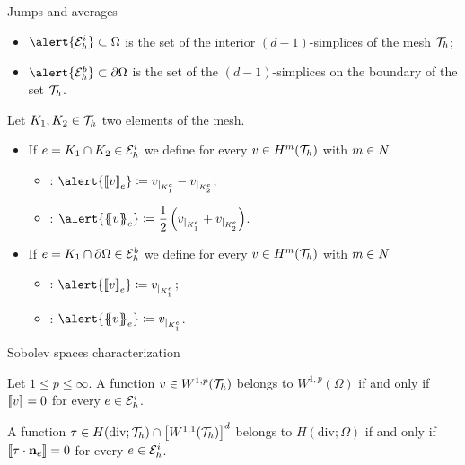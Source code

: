 \begin{frame}{Jumps and averages}
	\scriptsize
\begin{itemize}
	\item $\alert{\E_h^i}\subset\Omega$ is the set of the interior $(d-1)$-simplices of the mesh $\mathcal{T}_h$;
	\item $\alert{\E_h^b}\subset\partial\Omega$ is the set of the $(d-1)$-simplices on the boundary of the set $\mathcal{T}_h$.
\end{itemize}

\begin{definicion}
	Let $K_1,K_2\in\mathcal{T}_h$ two elements of the mesh.
	
	\begin{itemize}
		\item If $e=K_1\cap K_2\in \mathcal{E}_h^i$ we define for every $v\in H^m(\mathcal{T}_h)$ with $m\in\relax N$
		
		\begin{itemize}\itemsep1em
			\item {}: $\alert{\salto{v}_e}\coloneqq v_{|_{K_1^e}}-v_{|_{K_{2}^e}}$;
			\item {}: $\alert{\media{v}_e}\coloneqq \dfrac{1}{2}\left(v_{|_{K_1^e}}+v_{|_{K_{2}^e}}\right) $.
		\end{itemize}
		
		\item If $e=K_1\cap \partial\Omega\in \mathcal{E}_h^b$ we define for every $v\in H^m(\mathcal{T}_h)$ with $m\in\relax N$
		
		\begin{itemize}\itemsep1em
			\item {}: $\alert{\salto{v}_e}\coloneqq v_{|_{K_1^e}}$;
			\item {}: $\alert{\media{v}_e}\coloneqq v_{|_{K_1^e}}$.
		\end{itemize}
		
	\end{itemize}
	
\end{definicion}
\end{frame}

\begin{frame}{Sobolev spaces characterization}

\begin{lemma}
	\label{lemma:caracterizacion_sobolev}
	Let $1\leq p\leq \infty$. A function $v\in W^{1,p}(\mathcal{T}_h)$ belongs to $W^{1,p}(\Omega)$ if and only if $\left[\!\left[v\right]\!\right]=0$ for every $e\in\mathcal{E}_h^i$.
\end{lemma}

\begin{lemma}
	A function $\tau\in H(\text{div};\mathcal{T}_h)\cap \left[W^{1,1}(\mathcal{T}_h)\right]^d$ belongs to $H(\text{div};\Omega)$ if and only if $\left[\!\left[\tau\cdot\mathbf{n}_e\right]\!\right]=0$ for every $e\in\mathcal{E}_h^i$.
\end{lemma}

\end{frame}

